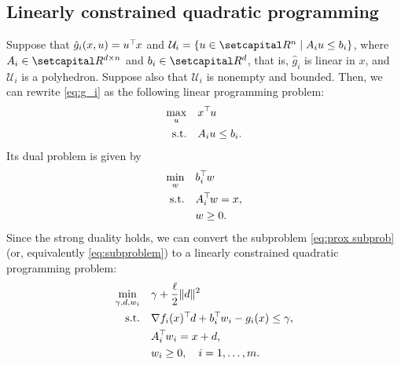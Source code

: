 \documentclass[../../main]{subfiles}
\begin{document}
\subsection{Linearly constrained quadratic programming} \label{sec:pgm:robust:QP}
Suppose that $\hat{g}_i (x,u) = u^\top\hspace{-1pt} x$ and ${\mathcal{U}}_i = \{ u \in \setR^n \mid A_i u \leq b_i \}$, where $A_i \in \setR^{d \times n}$ and $b_i \in \setR^d$, that is, $\hat{g}_i$ is linear in $x$, and $\mathcal{U}_i$ is a polyhedron. Suppose also that $\mathcal{U}_i$ is nonempty and bounded. Then, we can rewrite \cref{eq:g_i} as the following linear programming problem:
\begin{align}\label{eq:lp}
\begin{aligned}
\max_u \quad   & x^\top\hspace{-1pt} u \\ 
\mathrm{s.t.}    \quad   & A_i u \leq b_i.
\end{aligned}
\end{align}
Its dual problem is given by
\begin{align}
\begin{aligned}
\min_w \quad   & b_i^\top\hspace{-1pt} w \\ 
\mathrm{s.t.}    \quad   & A_i^\top\hspace{-1pt} w = x, \\
&w \geq 0.
\end{aligned}
\end{align}
Since the strong duality holds, we can convert the subproblem \cref{eq:prox subprob} (or, equivalently \cref{eq:subproblem}) to a linearly constrained quadratic programming problem:
\begin{align}\label{eq:qp}
\begin{aligned}
\min_{\gamma, d, w_i} \quad   &\gamma + \frac{\ell}{2}\|d\|^2  \\ 
\mathrm{s.t.}    \quad   &\nabla f_i(x)^\top\hspace{-1pt} d + b_i^\top\hspace{-1pt} w_i - g_i(x) \leq \gamma, \\
& A_i^\top\hspace{-1pt} w_i = x + d, \\
&w_i \geq 0, \quad i = 1,\ldots,m.
\end{aligned}
\end{align}
\end{document}
